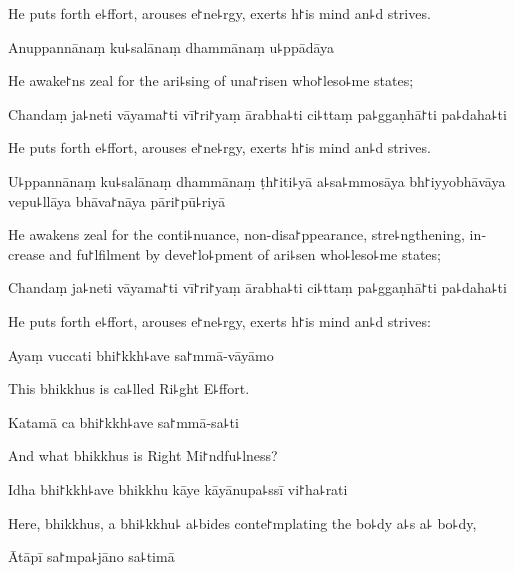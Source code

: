 \begin{english}
  He puts forth e꜕ffort, arouses e꜓ne꜕rgy, exerts h꜓is mind an꜕d strives.
\end{english}

Anuppannānaṃ ku꜕salānaṃ dhammānaṃ u꜕ppādāya

\begin{english}
  He awake꜓ns zeal for the ari꜕sing of una꜓risen who꜓leso꜕me states;
\end{english}

Chandaṃ ja꜕neti vāyama꜓ti vī꜓ri꜓yaṃ ārabha꜕ti ci꜕ttaṃ pa꜕ggaṇhā꜓ti pa꜕daha꜕ti

\begin{english}
  He puts forth e꜕ffort, arouses e꜓ne꜕rgy, exerts h꜓is mind an꜕d strives.
\end{english}

U꜕ppannānaṃ ku꜕salānaṃ dhammānaṃ ṭh꜓iti꜕yā a꜕sa꜕mmosāya bh꜓iyyobhāvāya vepu꜕llāya bhāva꜓nāya pāri꜓pū꜕riyā

\begin{english}
  He awakens zeal for the conti꜕nuance, non-disa꜓ppearance, stre꜕ngthening, increase and fu꜓lfilment by deve꜓lo꜕pment of ari꜕sen who꜕leso꜕me states;
\end{english}

Chandaṃ ja꜕neti vāyama꜓ti vī꜓ri꜓yaṃ ārabha꜕ti ci꜕ttaṃ pa꜕ggaṇhā꜓ti pa꜕daha꜕ti

\begin{english}
  He puts forth e꜕ffort, arouses e꜓ne꜕rgy, exerts h꜓is mind an꜕d strives:
\end{english}

Ayaṃ vuccati bhi꜓kkh꜕ave sa꜓mmā-vāyāmo

\begin{english}
  This bhikkhus is ca꜕lled Ri꜕ght E꜕ffort.
\end{english}

Katamā ca bhi꜓kkh꜕ave sa꜓mmā-sa꜕ti

\begin{english}
  And what bhikkhus is Right Mi꜓ndfu꜕lness?
\end{english}

Idha bhi꜓kkh꜕ave bhikkhu kāye kāyānupa꜕ssī vi꜓ha꜕rati

\begin{english}
  Here, bhikkhus, a bhi꜕kkhu꜕ a꜕bides conte꜓mplating the bo꜕dy a꜕s a꜕ bo꜕dy,
\end{english}

Ātāpī sa꜓mpa꜕jāno sa꜕timā

